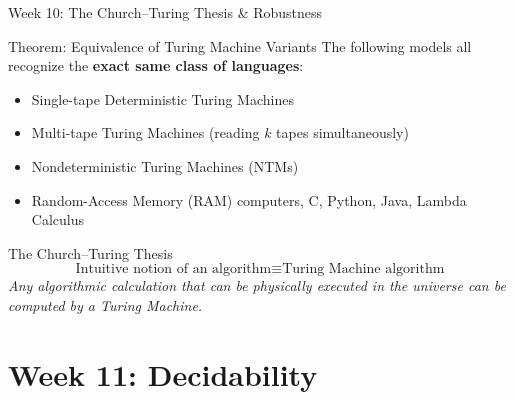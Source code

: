 \documentclass[aspectratio=169,10pt]{beamer}
\begin{document}
\begin{frame}{Week 10: The Church--Turing Thesis \& Robustness}
    \begin{block}{Theorem: Equivalence of Turing Machine Variants}
        The following models all recognize the \textbf{exact same class of languages}:
        \begin{itemize}
            \item Single-tape Deterministic Turing Machines
            \item Multi-tape Turing Machines (reading $k$ tapes simultaneously)
            \item Nondeterministic Turing Machines (NTMs)
            \item Random-Access Memory (RAM) computers, C, Python, Java, Lambda Calculus
        \end{itemize}
    \end{block}
    
    \begin{alertblock}{The Church--Turing Thesis}
        $$\text{Intuitive notion of an algorithm} \equiv \text{Turing Machine algorithm}$$
        \textit{Any algorithmic calculation that can be physically executed in the universe can be computed by a Turing Machine.}
    \end{alertblock}
\end{frame}

\section{Week 11: Decidability}
\end{document}

